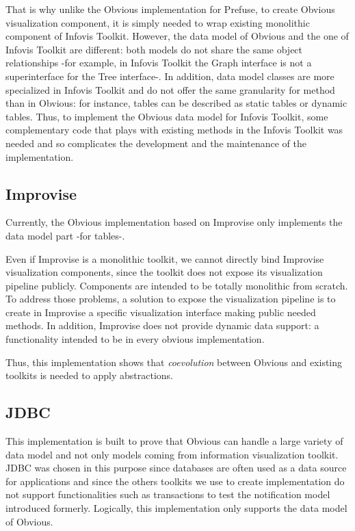 That is why unlike the Obvious implementation for Prefuse, to create Obvious visualization component, it is simply needed to wrap existing monolithic component of Infovis Toolkit. However, the data model of Obvious and the one of Infovis Toolkit are different: both models do not share the same object relationships -for example, in Infovis Toolkit the Graph interface is not a superinterface for the Tree interface-. In addition, data model classes are more specialized in Infovis Toolkit and do not offer the same granularity for method than in Obvious: for instance, tables can be described as static tables or dynamic tables. Thus, to implement the Obvious data model for Infovis Toolkit, some complementary code that plays with existing methods in the Infovis Toolkit was needed and so complicates the development and the maintenance of the implementation.

\subsection{Improvise}

Currently, the Obvious implementation based on Improvise only implements the data model part -for tables-.

Even if Improvise is a monolithic toolkit, we cannot directly bind Improvise visualization components, since the toolkit does not expose its visualization pipeline publicly. Components are intended to be totally monolithic from scratch. To address those problems, a solution to expose the visualization pipeline is to create in Improvise a specific visualization interface making public needed methods. In addition, Improvise does not provide dynamic data support: a functionality intended to be in every obvious implementation.

Thus, this implementation shows that \emph{coevolution} between Obvious and existing toolkits is needed to apply abstractions.

\subsection{JDBC}

This implementation is built to prove that Obvious can handle a large variety of data model and not only models coming from information visualization toolkit. JDBC was chosen in this purpose since databases are often used as a data source for applications and since the others toolkits we use to create implementation do not support functionalities such as transactions to test the notification model introduced formerly. Logically, this implementation only supports the data model of Obvious.

